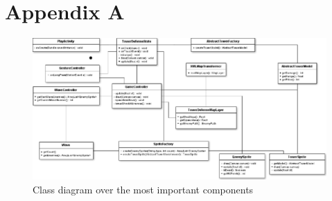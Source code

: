 \section{Appendix A}

\begin{figure} [h]
	\center
		\includegraphics[width=1\linewidth]{main/figures/logicalview}
		\caption{Class diagram over the most important components}
		\label{fig:structure}
\end{figure}

